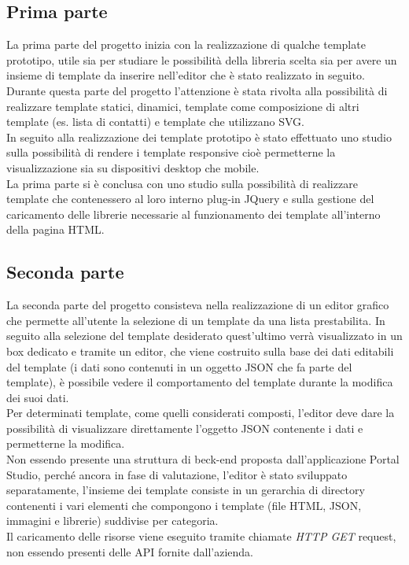 \subsection{Prima parte}
La prima parte del progetto inizia con la realizzazione di qualche template prototipo, utile sia per studiare le possibilità della libreria scelta sia per avere un insieme di template da inserire nell'editor che è stato realizzato in seguito.\\
Durante questa parte del progetto l'attenzione è stata rivolta alla possibilità di realizzare template statici, dinamici, template come composizione di altri template (es. lista di contatti) e template che utilizzano SVG.\\
In seguito alla realizzazione dei template prototipo è stato effettuato uno studio sulla possibilità di rendere i template responsive cioè permetterne la visualizzazione sia su dispositivi desktop che mobile.\\
La prima parte si è conclusa con uno studio sulla possibilità di realizzare template che contenessero al loro interno plug-in JQuery e sulla gestione del caricamento delle librerie necessarie al funzionamento dei template all'interno della pagina HTML.

\subsection{Seconda parte}
La seconda parte del progetto consisteva nella realizzazione di un editor grafico che permette all'utente la selezione di un template da una lista prestabilita.
In seguito alla selezione del template desiderato quest'ultimo verrà visualizzato in un box dedicato e tramite un editor, che viene costruito sulla base dei dati editabili del template (i dati sono contenuti in un oggetto JSON che fa parte del template), è possibile vedere il comportamento del template durante la modifica dei suoi dati.	\\
Per determinati template, come quelli considerati composti, l'editor deve dare la possibilità di visualizzare direttamente l'oggetto JSON contenente i dati e permetterne la modifica.\\
Non essendo presente una struttura di beck-end proposta dall'applicazione Portal Studio, perché ancora in fase di valutazione, l'editor è stato sviluppato separatamente, l'insieme dei template consiste in un gerarchia di directory contenenti i vari elementi che compongono i template (file HTML, JSON, immagini e librerie) suddivise per categoria.\\
Il caricamento delle risorse viene eseguito tramite chiamate \textit{HTTP GET} request, non essendo presenti delle API fornite dall'azienda.

